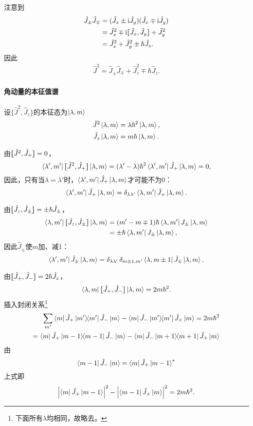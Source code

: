 注意到
\begin{align*}
	\hat J_\pm\hat J_\mp&=(\hat J_x\pm\i\hat J_y)(\hat J_x\mp\i\hat J_y)\\
	&=\hat J_x^2\mp\i\cmm{J_x}{J_y}+\hat J_y^2\\
	&=\hat J_x^2+\hat J_y^2\pm\hbar\hat J_z.
\end{align*}
因此 
\begin{align}
	\hat J^2=\hat J_\pm\hat J_\mp+\hat J_z^2\mp\hbar\hat J_z.
\end{align}
\paragraph*{角动量的本征值谱}设$\{\hat J^2,\hat J_z\}$的本征态为$\ket{\lambda,m}$
\begin{align*}
	\hat J^2\ket{\lambda,m}&=\lambda\hbar^2\ket{\lambda,m},\\
	\hat J_z\ket{\lambda,m}&=m\hbar\ket{\lambda,m}.
\end{align*}

由$\cmm{J^2}{J_+}=0$，
\[
	\bra{\lambda',m'}\cmm{J^2}{J_+}\ket{\lambda,m}=(\lambda'-\lambda)\hbar^2\bra{\lambda',m'}\hat J_+\ket{\lambda,m}=0,
\]
因此，只有当$\lambda=\lambda'$时，$\bra{\lambda',m'}\hat J_+\ket{\lambda,m}$才可能不为0：
\begin{align}
	\bra{\lambda',m'}\hat J_+\ket{\lambda,m}=\vd_{\lambda\lambda'}\bra{\lambda,m'}\hat J_+\ket{\lambda,m}.
\end{align}

由$\cmm{J_z}{J_\pm}=\pm\hbar\hat J_\pm$，
\begin{align*}
	\bra{\lambda,m'}\cmm{J_z}{J_\pm}\ket{\lambda,m}&=(m'-m\mp 1)\hbar\bra{\lambda,m'}J_\pm\ket{\lambda,m}\\
	&=\pm\hbar\bra{\lambda,m'}J_\pm\ket{\lambda,m},
\end{align*}
因此$\hat J_\pm$使$m$加、减1：
\begin{align}
	\bra{\lambda',m'}\hat J_\pm\ket{\lambda,m}=\vd_{\lambda\lambda'}\vd_{m\pm 1,m'}\bra{\lambda,m\pm 1}\hat J_\pm\ket{\lambda,m}.
\end{align}

由$\cmm{J_+}{J_-}=2\hbar\hat J_z$，
\[
	\bra{\lambda,m}\cmm{J_+}{J_-}\ket{\lambda,m}=2m\hbar^2.
\]%
插入封闭关系\footnote{下面所有$\lambda$均相同，故略去。}
\begin{align*}
	\sum_{m'}\bra{m}\hat J_+\ktbr{m'}{m'}\hat J_-\ket{m}-\bra{m}\hat J_-\ktbr{m'}{m'}\hat J_+\ket{m}=2m\hbar^2\\
	=\bra{m}\hat J_+\ktbr{m-1}{m-1}\hat J_-\ket{m}-\bra{m}\hat J_-\ktbr{m+1}{m+1}\hat J_+\ket{m}
\end{align*}
由
\[
	\bra{m-1}\hat J_-\ket{m}=\bra{m}\hat J_+\ket{m-1}\cj
\]
上式即
\begin{align}
	\abs{\bra{m}\hat J_+\ket{m-1}}^2-\abs{\bra{m-1}\hat J_+\ket{m}}^2=2m\hbar^2.
\end{align}

